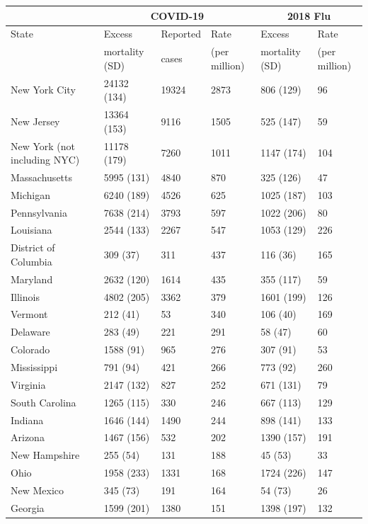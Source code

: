 \documentclass[11pt]{article}
\begin{document}
\begin{table}
\centering
\tiny
\begin{tabular}{|l|lll|ll|}
  \hline
 & \multicolumn{3}{c|}{COVID-19} & \multicolumn{2}{c|}{2018 Flu} \\
\hline
State & Excess & Reported & Rate  & Excess & Rate \\
 & mortality (SD) & cases & (per million) & mortality (SD) & (per million) \\
\hline
New York City & 24132 (134) & 19324 & 2873 & 806 (129) & 96 \\ 
  New Jersey & 13364 (153) & 9116 & 1505 & 525 (147) & 59 \\ 
  New York (not including NYC) & 11178 (179) & 7260 & 1011 & 1147 (174) & 104 \\ 
  Massachusetts & 5995 (131) & 4840 & 870 & 325 (126) & 47 \\ 
  Michigan & 6240 (189) & 4526 & 625 & 1025 (187) & 103 \\ 
  Pennsylvania & 7638 (214) & 3793 & 597 & 1022 (206) & 80 \\ 
  Louisiana & 2544 (133) & 2267 & 547 & 1053 (129) & 226 \\ 
  District of Columbia & 309 (37) & 311 & 437 & 116 (36) & 165 \\ 
  Maryland & 2632 (120) & 1614 & 435 & 355 (117) & 59 \\ 
  Illinois & 4802 (205) & 3362 & 379 & 1601 (199) & 126 \\ 
  Vermont & 212 (41) & 53 & 340 & 106 (40) & 169 \\ 
  Delaware & 283 (49) & 221 & 291 & 58 (47) & 60 \\ 
  Colorado & 1588 (91) & 965 & 276 & 307 (91) & 53 \\ 
  Mississippi & 791 (94) & 421 & 266 & 773 (92) & 260 \\ 
  Virginia & 2147 (132) & 827 & 252 & 671 (131) & 79 \\ 
  South Carolina & 1265 (115) & 330 & 246 & 667 (113) & 129 \\ 
  Indiana & 1646 (144) & 1490 & 244 & 898 (141) & 133 \\ 
  Arizona & 1467 (156) & 532 & 202 & 1390 (157) & 191 \\ 
  New Hampshire & 255 (54) & 131 & 188 & 45 (53) & 33 \\ 
  Ohio & 1958 (233) & 1331 & 168 & 1724 (226) & 147 \\ 
  New Mexico & 345 (73) & 191 & 164 & 54 (73) & 26 \\ 
  Georgia & 1599 (201) & 1380 & 151 & 1398 (197) & 132 \\ 

\end{tabular}
\end{table}
\end{document}
